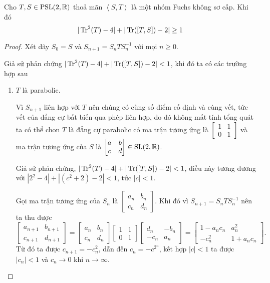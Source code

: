 \begin{thm}\label{thm 3.4.7}
    Cho $T,S \in \operatorname{PSL}(2,\mathbb{R})$ thoả mãn $\left<S,T\right>$ là một nhóm Fuchs không sơ cấp. Khi đó
    \[|\operatorname{Tr}^2(T)-4|+|\operatorname{Tr}([T,S])-2| \geq 1\]
\end{thm}
\begin{proof}
    Xét dãy $S_0 = S$ và $S_{n+1} = S_nTS_n^{-1}$ với mọi $n\geq 0$. 
    
    Giả sử phản chứng $|\operatorname{Tr}^2(T)-4|+|\operatorname{Tr}([T,S])-2| < 1$, khi đó ta có các trường hợp sau
    \begin{enumerate}
        \item $T$ là parabolic.

        Vì $S_{n+1}$ liên hợp với $T$ nên chúng có cùng số điểm cố định và cùng vết, tức vết của đẳng cự bất biến qua phép liên hợp, do đó không mất tính tổng quát ta có thể chon $T$ là đẳng cự parabolic có ma trận tương ứng là $\begin{bmatrix}
            1 & 1\\
            0 & 1
        \end{bmatrix}$ và ma trận tương ứng của $S$ là $\begin{bmatrix} a & b \\ c & d \\ \end{bmatrix} \in \operatorname{SL}(2,\mathbb{R})$. 

        Giả sử phản chứng, $|\operatorname{Tr}^2(T)-4|+|\operatorname{Tr}([T,S])-2| < 1$, điều này tương đương với $|2^2-4|+ |(c^2+2)-2| < 1$, tức $|c| < 1$.

        Gọi ma trận tương ứng của $S_n$ là 
        $\begin{bmatrix}
            a_n & b_n\\
            c_n & d_n
        \end{bmatrix}$. 
        Khi đó vì $S_{n+1} = S_nTS_n^{-1}$ nên ta thu được
        \[\begin{bmatrix}
            a_{n+1} & b_{n+1}\\
            c_{n+1} & d_{n+1}
        \end{bmatrix} = \begin{bmatrix}
            a_n & b_n\\
            c_n & d_n
        \end{bmatrix}\begin{bmatrix}
            1 & 1\\
            0 & 1
        \end{bmatrix}\begin{bmatrix}
            d_n & -b_n\\
            -c_n & a_n
        \end{bmatrix} = \begin{bmatrix}
            1-a_nc_n & a_n^2\\
            -c_n^2 & 1+a_nc_n
        \end{bmatrix}.\]
        Từ đó ta được $c_{n+1} = -c_n^2$, dẫn đến $c_n = -c^{2^n}$, kết hợp $|c|<1$ ta được $|c_n| < 1$ và $c_n \to 0$ khi $n\to \infty$.


\end{enumerate}
\end{proof}
